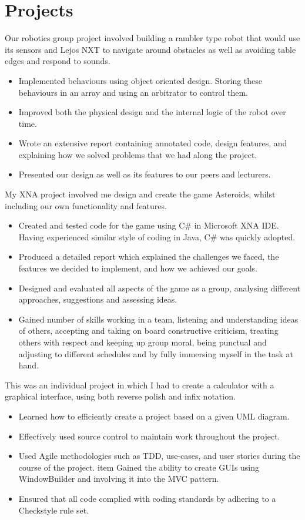 \documentclass[10pt,a4paper]{moderncv}
\begin{document}
\section{Projects}
{
	Our robotics group project involved building a rambler type robot that would use its sensors and Lejos NXT to navigate around obstacles as well as avoiding table edges and respond to sounds.
	\begin{itemize}
		\item Implemented behaviours using object oriented design. Storing these behaviours in an array and using an arbitrator to control them.
		\item Improved both the physical design and the internal logic of the robot over time.
		\item Wrote an extensive report containing annotated code, design features, and explaining how we solved problems that we had along the project.
		\item Presented our design as well as its features to our peers and lecturers.
	\end{itemize}
}
{
	My XNA project involved me design and create the game Asteroids, whilst including our own functionality and features.
	\begin{itemize}
		\item Created and tested code for the game using C\# in Microsoft XNA IDE. Having experienced similar style of coding in Java, C\# was quickly adopted.
		\item Produced a detailed report which explained the challenges we faced, the features we decided to implement, and how we achieved our goals.
		\item Designed and evaluated all aspects of the game as a group, analysing different approaches, suggestions and assessing ideas.
		\item Gained number of skills working in a team, listening and understanding ideas of others, accepting and taking on board constructive criticism, treating others with respect and keeping up group moral, being punctual and adjusting to different schedules and by fully immersing myself in the task at hand.
	\end{itemize}
}
{
	This was an individual project in which I had to create a calculator with a graphical interface, using both reverse polish and infix notation.
	\begin{itemize}
		\item Learned how to efficiently create a project based on a given UML diagram.
		\item Effectively used source control to maintain work throughout the project.
		\item Used Agile methodologies such as TDD, use-cases, and user stories during the course of the project.
		item Gained the ability to create GUIs using WindowBuilder and involving it into the MVC pattern.
		\item Ensured that all code complied with coding standards by adhering to a Checkstyle rule set.
	\end{itemize}
}
\end{document}
